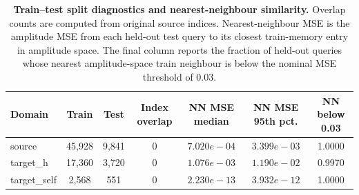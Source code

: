 \begin{table}[htbp!]
\centering
\caption{\textbf{Train--test split diagnostics and nearest-neighbour similarity.}
Overlap counts are computed from original source indices. Nearest-neighbour MSE is the amplitude MSE from each held-out test query to its closest train-memory entry in amplitude space. The final column reports the fraction of held-out queries whose nearest amplitude-space train neighbour is below the nominal MSE threshold of 0.03.}
\label{tab:si_split_similarity}
\footnotesize
\setlength{\tabcolsep}{4.0pt}
\renewcommand{\arraystretch}{1.12}
\begin{tabular}{lcccccc}
\toprule
Domain & Train & Test & Index overlap & NN MSE median & NN MSE 95th pct. & NN below 0.03 \\
\midrule
source & 45,928 & 9,841 & 0 & $7.020e-04$ & $3.399e-03$ & 1.0000 \\
target_h & 17,360 & 3,720 & 0 & $1.076e-03$ & $1.190e-02$ & 0.9970 \\
target_self & 2,568 & 551 & 0 & $2.230e-13$ & $3.932e-12$ & 1.0000 \\
\bottomrule
\end{tabular}
\end{table}
